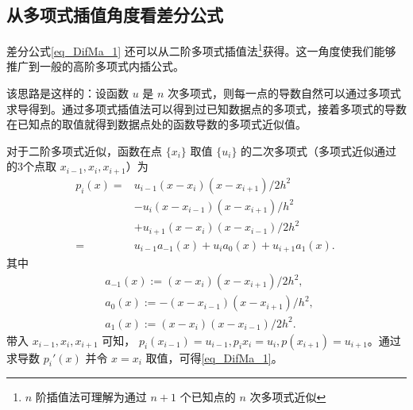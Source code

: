 \subsection{从多项式插值角度看差分公式}
差分公式\autoref{eq_DifMa_1} 还可以从二阶多项式插值法\footnote{$n$ 阶插值法可理解为通过 $n+1$ 个已知点的 $n$ 次多项式近似}获得。这一角度使我们能够推广到一般的高阶多项式内插公式。

该思路是这样的：设函数 $u$ 是 $n$ 次多项式，则每一点的导数自然可以通过多项式求导得到。通过多项式插值法可以得到过已知数据点的多项式，接着多项式的导数在已知点的取值就得到数据点处的函数导数的多项式近似值。

对于二阶多项式近似，函数在点 $\{x_i\}$ 取值 $\{u_i\}$ 的二次多项式（多项式近似通过的3个点取 $x_{i-1},x_i,x_{i+1}$）为
\begin{equation}\label{eq_DifMa_3}
\begin{aligned}
p_i(x)=&u_{i-1}(x-x_i)(x-x_{i+1})/2h^2\\
&-u_{i}(x-x_{i-1})(x-x_{i+1})/h^2\\
&+u_{i+1}(x-x_i)(x-x_{i-1})/2h^2\\
=& u_{i-1}a_{-1}(x)+u_{i}a_0(x)+u_{i+1}a_1(x).
\end{aligned}~
\end{equation}
 其中
 \begin{equation}
 \begin{aligned}
 & a_{-1}(x):=(x-x_i)(x-x_{i+1})/2h^2,\\
 &a_{0}(x):=-(x-x_{i-1})(x-x_{i+1})/h^2,\\
 &a_{1}(x):=(x-x_i)(x-x_{i-1})/2h^2.
 \end{aligned}~
 \end{equation}
 带入 $x_{i-1},x_i,x_{i+1}$ 可知， $p_i(x_{i-1})=u_{i-1},p_i{x_{i}}=u_i,p(x_{i+1})=u_{i+1}$。通过求导数 $p_i'(x)$ 并令 $x=x_i$ 取值，可得\autoref{eq_DifMa_1}。

